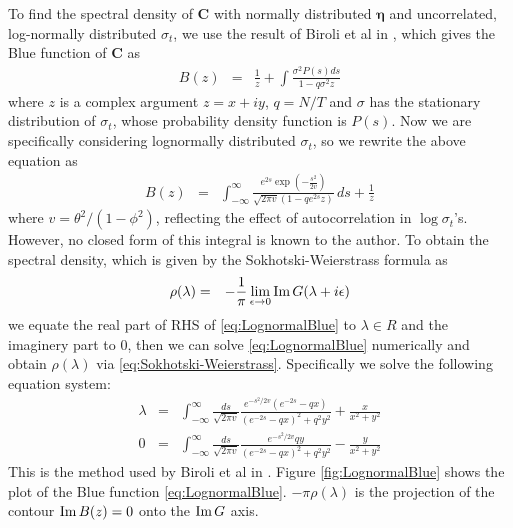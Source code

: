 \documentclass{article}
\begin{document}
To find the spectral density of $\bm C$ with normally distributed $\bm
\eta$ and uncorrelated, log-normally distributed $\sigma_t$, we use
the result of Biroli et al in \cite{biroli2007student}, which gives
the Blue function of $\bm C$ as
\begin{eqnarray*}
  B(z) &=& \frac{1}{z} + \int \frac{\sigma ^2 P(s) ds}{1-q \sigma ^2 z}
\end{eqnarray*}
where $z$ is a complex argument $z = x + i y$, $q = N/T$ and $\sigma$
has the stationary distribution of $\sigma_t$, whose probability
density function is $P(s)$. Now we are specifically considering
lognormally distributed $\sigma_t$, so we rewrite the above equation as
\begin{eqnarray}
B(z) &=& \int_{-\infty }^{\infty } \frac{e^{2 s} \exp \left(-\frac{s^2}{2
      v}\right)}{\sqrt{2 \pi  v} \left(1-q e^{2 s} z\right)} \,
ds+\frac{1}{z} \label{eq:LognormalBlue}
\end{eqnarray}
where $v = \theta^2/(1 - \phi^2)$, reflecting the effect
of autocorrelation in $\log \sigma_t$'s. However, no closed form of
this integral is known to the author. To obtain the spectral density,
which is given by the Sokhotski-Weierstrass formula as
\begin{eqnarray}
  \rho(\lambda) &=& -{1 \over \pi} \lim_{\epsilon \to 0} \text{Im}\, G(\lambda +
  i\epsilon) \label{eq:Sokhotski-Weierstrass}
\end{eqnarray}
we equate the real part of RHS of \eqref{eq:LognormalBlue} to $\lambda \in
R$ and the imaginery part to 0, then we can solve \eqref{eq:LognormalBlue}
numerically and obtain $\rho(\lambda)$ via
\eqref{eq:Sokhotski-Weierstrass}. Specifically we solve the following
equation system:
\begin{eqnarray}
\lambda &=& \int_{-\infty}^{\infty} \frac{ds}{\sqrt{2\pi v}}
\frac{
  e^{-s^2/2v}(e^{-2s} - qx)
}{
  (e^{-2s} - qx)^2 + q^2 y^2  
} +
\frac{x}{x^2 + y^2} \label{eq:LognormalBlueReal}\\
0 &=& \int_{-\infty}^{\infty} \frac{ds}{\sqrt{2\pi v}}
\frac{
  e^{-s^2/2v} q y
}{
  (e^{-2s} - qx)^2 + q^2 y^2  
} -
\frac{y}{x^2 + y^2} \label{eq:LognormalBlueImag}
\end{eqnarray}
This is the method used by Biroli et al in
\cite{biroli2007student}. Figure \ref{fig:LognormalBlue}
shows the plot of the Blue function \eqref{eq:LognormalBlue}. $-\pi
\rho(\lambda)$ is the projection of the contour $\text{Im}\, B(z) = 0$ onto the $\text{Im}\,
G$ axis.
\end{document}
